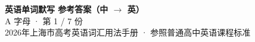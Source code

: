 \documentclass[10pt,a4paper]{article}
\begin{document}
\pagestyle{plain}

\begin{center}
{\LARGE\bfseries 英语单词默写 \quad 参考答案（中 $\to$ 英）}\\[0.22em]
{\large A 字母 · 第 1 / 7 份}\\[0.18em]
{\small 2026年上海市高考英语词汇用法手册 · 参照普通高中英语课程标准}
\end{center}

\vspace{0.2em}
\noindent{\color{rulegray}\rule{\textwidth}{0.8pt}}

\vspace{0.35em}

\vspace{0.25em}
\renewcommand{\arraystretch}{1.32}
\end{document}
